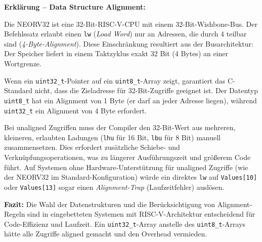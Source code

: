 \textbf{Erklärung -- Data Structure Alignment:}

Die NEORV32 ist eine 32-Bit-RISC-V-CPU mit einem 32-Bit-Wishbone-Bus. Der Befehlssatz erlaubt einen \texttt{lw} (\emph{Load Word}) nur an Adressen, die durch 4 teilbar sind (\emph{4-Byte-Alignment}). Diese Einschränkung resultiert aus der Busarchitektur: Der Speicher liefert in einem Taktzyklus exakt 32 Bit (4 Bytes) an einer Wortgrenze.

Wenn ein \texttt{uint32\_t}-Pointer auf ein \texttt{uint8\_t}-Array zeigt, garantiert das C-Standard nicht, dass die Zieladresse für 32-Bit-Zugriffe geeignet ist. Der Datentyp \texttt{uint8\_t} hat ein Alignment von 1 Byte (er darf an jeder Adresse liegen), während \texttt{uint32\_t} ein Alignment von 4 Byte erfordert.

Bei unaligned Zugriffen muss der Compiler den 32-Bit-Wert aus mehreren, kleineren, erlaubten Ladungen (\texttt{lhu} für 16 Bit, \texttt{lbu} für 8 Bit) manuell zusammensetzen. Dies erfordert zusätzliche Schiebe- und Verknüpfungsoperationen, was zu längerer Ausführungszeit und größerem Code führt. Auf Systemen ohne Hardware-Unterstützung für unaligned Zugriffe (wie der NEORV32 im Standard-Konfiguration) würde ein direktes \texttt{lw} auf \texttt{Values[10]} oder \texttt{Values[13]} sogar einen \emph{Alignment-Trap} (Laufzeitfehler) auslösen.

\textbf{Fazit:} Die Wahl der Datenstrukturen und die Berücksichtigung von Alignment-Regeln sind in eingebetteten Systemen mit RISC-V-Architektur entscheidend für Code-Effizienz und Laufzeit. Ein \texttt{uint32\_t}-Array anstelle des \texttt{uint8\_t}-Arrays hätte alle Zugriffe aligned gemacht und den Overhead vermieden.